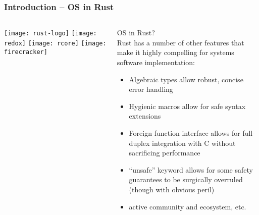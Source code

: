 \begin{frame}[plain]
	\frametitle{Introduction -- OS in Rust}
	
	
	
	\begin{columns}
		
		\begin{column}{.2\textwidth}
			
			\texttt{[image: rust-logo]}
			\texttt{[image: redox]}
			\texttt{[image: rcore]}
			\texttt{[image: firecracker]}
		\end{column}
		
		\begin{column}{.8\textwidth}
			
			OS in Rust? \\
			Rust has a number of other features that make it highly
			compelling for systems software implementation:
			
			\begin{itemize}
				
				\item Algebraic types allow robust, concise error handling
				\item Hygienic macros allow for safe syntax extensions	
				\item Foreign function interface allows for full-duplex integration
				with C without sacrificing performance		
				\item  “unsafe” keyword allows for some safety guarantees to be
				surgically overruled (though with obvious peril)
				\item active community and ecosystem, etc.
				
				
				
			\end{itemize}
			
		\end{column}
		
		
	\end{columns}
	
	
\end{frame}


